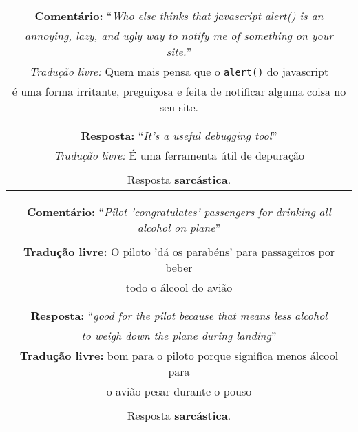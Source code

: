 \begin{center}
\begin{tabular}{|c|}

\hline

\textbf{Comentário:} ``\textit{Who else thinks that javascript alert() is an} \\
\textit{annoying, lazy, and ugly way to notify me of something on your site.}''
\\

\textit{Tradução livre:} Quem mais pensa que o \texttt{alert()} do javascript \\
é uma forma irritante, preguiçosa e feita de notificar alguma coisa no seu
site. \\\\

\hline

\\

\textbf{Resposta:} ``\textit{It's a useful debugging tool}'' \\

\textit{Tradução livre:} É uma ferramenta útil de depuração \\ \\


Resposta \textbf{sarcástica}.

\\ \hline

\end{tabular}
\end{center}

\begin{center}
\begin{tabular}{|c|}

\hline

\textbf{Comentário:} ``\textit{Pilot 'congratulates' passengers for drinking}
\textit{all alcohol on plane}'' \\
\\

\textbf{Tradução livre:} O piloto 'dá os parabéns' para passageiros por beber \\
todo o álcool do avião \\\\

\hline

\\

\textbf{Resposta:} ``\textit{good for the pilot because that means less alcohol} \\
\textit{to weigh down the plane during landing}'' \\

\textbf{Tradução livre:} bom para o piloto porque significa menos álcool para \\
o avião pesar durante o pouso \\ \\

Resposta \textbf{sarcástica}.

\\ \hline

\end{tabular}
\end{center}

